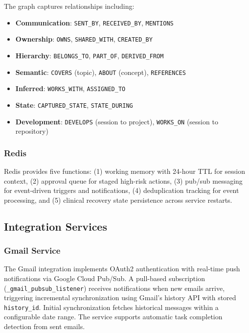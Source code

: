 \documentclass[11pt,a4paper]{article}
\begin{document}
The graph captures relationships including:
\begin{itemize}
    \item \textbf{Communication}: \texttt{SENT\_BY}, \texttt{RECEIVED\_BY}, \texttt{MENTIONS}
    \item \textbf{Ownership}: \texttt{OWNS}, \texttt{SHARED\_WITH}, \texttt{CREATED\_BY}
    \item \textbf{Hierarchy}: \texttt{BELONGS\_TO}, \texttt{PART\_OF}, \texttt{DERIVED\_FROM}
    \item \textbf{Semantic}: \texttt{COVERS} (topic), \texttt{ABOUT} (concept), \texttt{REFERENCES}
    \item \textbf{Inferred}: \texttt{WORKS\_WITH}, \texttt{ASSIGNED\_TO}
    \item \textbf{State}: \texttt{CAPTURED\_STATE}, \texttt{STATE\_DURING}
    \item \textbf{Development}: \texttt{DEVELOPS} (session to project), \texttt{WORKS\_ON} (session to repository)
\end{itemize}

\subsubsection{Redis}

Redis provides five functions: (1) working memory with 24-hour TTL for session context, (2) approval queue for staged high-risk actions, (3) pub/sub messaging for event-driven triggers and notifications, (4) deduplication tracking for event processing, and (5) clinical recovery state persistence across service restarts.

\subsection{Integration Services}

\subsubsection{Gmail Service}

The Gmail integration implements OAuth2 authentication with real-time push notifications via Google Cloud Pub/Sub. A pull-based subscription (\texttt{\_gmail\_pubsub\_listener}) receives notifications when new emails arrive, triggering incremental synchronization using Gmail's history API with stored \texttt{history\_id}. Initial synchronization fetches historical messages within a configurable date range. The service supports automatic task completion detection from sent emails.
\end{document}
